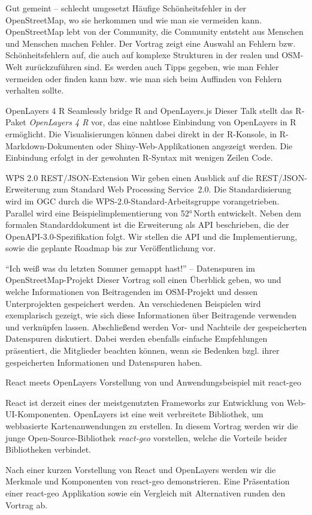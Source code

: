 
%
{Gut gemeint -- schlecht umgesetzt}%
{Häufige Schönheitsfehler in der OpenStreetMap, wo sie herkommen und wie man sie vermeiden kann.}%
{%
OpenStreetMap lebt von der Community, die Community entsteht aus Menschen und
Menschen machen Fehler. Der Vortrag zeigt eine Auswahl an Fehlern bzw.
Schönheitsfehlern auf, die auch auf komplexe Strukturen in der realen und
OSM-Welt zurückzuführen sind. Es werden auch Tipps gegeben, wie man Fehler
vermeiden oder finden kann bzw. wie man sich beim Auffinden von Fehlern
verhalten sollte.%
}

%
{OpenLayers 4 R}%
{Seamlessly bridge R and OpenLayers.js}%
{%
Dieser Talk stellt das R-Paket \emph{OpenLayers 4 R} vor, das eine nahtlose
Einbindung von OpenLayers in R ermöglicht. Die Visualisierungen können dabei
direkt in der R-Konsole, in R-Markdown-Dokumenten oder
Shiny-Web-Applikationen angezeigt werden. Die Einbindung erfolgt in der
gewohnten R-Syntax mit wenigen Zeilen Code.%
}

%
{WPS 2.0 REST/JSON-Extension}%
{}%
{%
Wir geben einen Ausblick auf die REST/JSON-Erweiterung zum Standard Web
Processing Service~2.0. Die Standardisierung wird im OGC durch die
WPS-2.0-Standard-Arbeitsgruppe vorangetrieben. Parallel wird eine
Beispielimplementierung von 52°\,North entwickelt. Neben dem formalen
Standarddokument ist die Erweiterung als API beschrieben, die der
OpenAPI-3.0-Spezifikation folgt. Wir stellen die API und die Implementierung,
sowie die geplante Roadmap bis zur Veröffentlichung vor.%
}

%
{"`Ich weiß was du letzten Sommer gemappt hast!"' -- Datenspuren im OpenStreetMap-Projekt}%
{}%
{%
Dieser Vortrag soll einen Überblick geben, wo und welche Informationen von
Beitragenden im OSM-Projekt und dessen Unterprojekten gespeichert werden. An
verschiedenen Beispielen wird exemplarisch gezeigt, wie sich diese
Informationen über Beitragende verwenden und verknüpfen lassen. Abschließend
werden Vor- und Nachteile der gespeicherten Datenspuren diskutiert. Dabei
werden ebenfalls einfache Empfehlungen präsentiert, die Mitglieder beachten
können, wenn sie Bedenken bzgl. ihrer gespeicherten Informationen und
Datenspuren haben.%
}

%
{React meets OpenLayers}%
{Vorstellung von und Anwendungsbeispiel mit react-geo}%
{%
React ist derzeit eines der meistgenutzten Frameworks zur Entwicklung von
Web-UI-Komponenten. OpenLayers ist eine weit verbreitete Bibliothek, um
webbasierte Kartenanwendungen zu erstellen. In diesem Vortrag werden wir die
junge Open-Source-Bibliothek \emph{react-geo} vorstellen, welche die Vorteile beider 
Bibliotheken verbindet.

Nach einer kurzen Vorstellung von React und OpenLayers werden wir die Merkmale
und Komponenten von react-geo demonstrieren. Eine Präsentation einer react-geo
Applikation sowie ein Vergleich mit Alternativen runden den Vortrag ab.%
}

